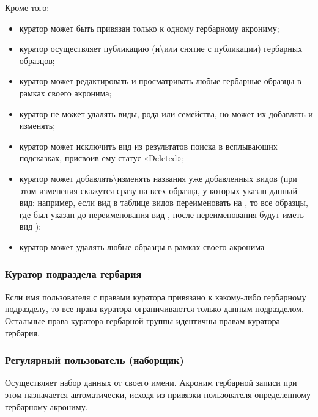 \documentclass[letterpaper,10pt,russian]{sphinxmanual}
\begin{document}
Кроме того:
\begin{itemize}
\item {} 
куратор может быть привязан только к одному гербарному акрониму;

\item {} 
куратор осуществляет публикацию (и\textbackslash{}или снятие с публикации) гербарных образцов;

\item {} 
куратор может редактировать и просматривать любые гербарные образцы в рамках своего акронима;

\item {} 
куратор не может удалять виды, рода или семейства, но может их добавлять и изменять;

\item {} 
куратор может исключить вид из результатов поиска в всплывающих подсказках, присвоив ему статус «Deleted»;

\item {} 
куратор может добавлять\textbackslash{}изменять названия уже добавленных видов (при этом изменения скажутся сразу на всех образца,
у которых указан данный вид: например, если вид  в таблице видов переименовать
на , то все образцы, где был указан до переименования вид ,
после переименования будут иметь вид );

\item {} 
куратор может удалять любые образцы в рамках своего акронима

\end{itemize}

\ignorespaces 

\subsubsection{Куратор подраздела гербария}
\label{\detokenize{main:index-6}}\label{\detokenize{main:id11}}
Если имя пользователя с правами куратора привязано к какому-либо гербарному подразделу,
то все права куратора ограничиваются только данным подразделом.
Остальные права куратора гербарной группы идентичны правам куратора гербария.

\ignorespaces 

\subsubsection{Регулярный пользователь (наборщик)}
\label{\detokenize{main:index-7}}\label{\detokenize{main:id12}}
Осуществляет набор данных от своего имени. Акроним гербарной записи при этом назначается автоматически,
исходя из привязки пользователя определенному гербарному акрониму.
\end{document}
